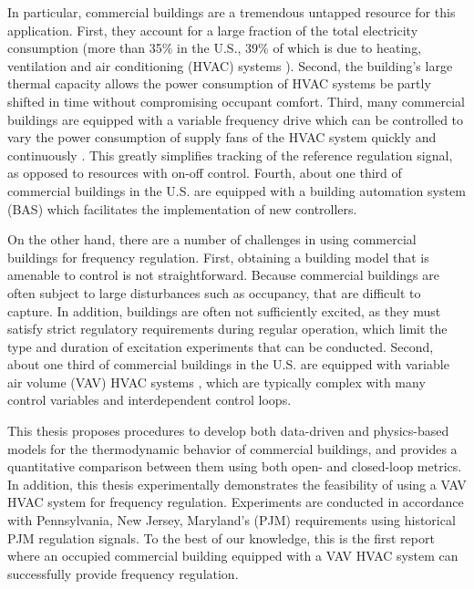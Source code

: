 \documentclass[../thesis.tex]{subfiles}
\begin{document}
In particular, commercial buildings are a tremendous untapped resource for this application. 
First, they account for a large fraction of the total electricity consumption (more than 35\% in the U.S., 39\% of which is due to heating, ventilation and air conditioning (HVAC) systems \cite{USenergy:2017}). 
Second, the building's large thermal capacity allows the power consumption of HVAC systems be partly shifted in time without compromising occupant comfort. 
Third, many commercial buildings are equipped with a variable frequency drive which can be controlled to vary the power consumption of supply fans of the HVAC system quickly and continuously \cite{Hao:2012demandresponse}. This greatly simplifies tracking of the reference regulation signal, as opposed to resources with on-off control.
Fourth, about one third of commercial buildings in the U.S. are equipped with a building automation system (BAS) \cite{Braun:2012} which facilitates the implementation of new controllers.

On the other hand, there are a number of challenges in using commercial buildings for frequency regulation. 
First, obtaining a building model that is amenable to control is not straightforward. 
Because commercial buildings are often subject to large disturbances such as occupancy, that are difficult to capture. 
In addition, buildings are often not sufficiently excited, as they must satisfy strict regulatory requirements during regular operation, which limit the type and duration of excitation experiments that can be conducted.
Second, about one third of commercial buildings in the U.S. are equipped with variable air volume (VAV) HVAC systems \cite{Hao:2012demandresponse}, which are typically complex with many control variables and interdependent control loops.

This thesis proposes procedures to develop both data-driven and physics-based models for the thermodynamic behavior of commercial buildings, and provides a quantitative comparison between them using both open- and closed-loop metrics. 
In addition, this thesis experimentally demonstrates the feasibility of using a VAV HVAC system for frequency regulation. 
Experiments are conducted in accordance with Pennsylvania, New Jersey, Maryland's (PJM) requirements using historical PJM regulation signals.
To the best of our knowledge, this is the first report where an occupied commercial building equipped with a VAV HVAC system can successfully provide frequency regulation.
\end{document}
